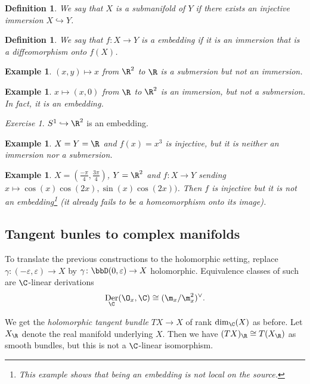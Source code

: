 \documentclass[A4paper, british]{amsart}
\theoremstyle{darkgreentheorem}
\theoremstyle{darkbluedefinition}
\newtheorem{defn}[thm]{Definition}
\theoremstyle{darkredexample}
\newtheorem{exa}[thm]{Example}
\theoremstyle{remark}
\newtheorem{exe}[thm]{Exercise}
\DeclareMathOperator{\Der}{Der}
\newcommand{\1}{\mathbbm{1}}
\newcommand{\dual}{^{\vee}}
\newcommand{\mono}{\hookrightarrow}
\begin{document}
\begin{defn}
    We say that $X$ is a \textit{submanifold} of $Y$ if there exists an injective immersion $X\mono Y$.
\end{defn}

\begin{defn}
    We say that $f\colon X\to Y$ is a \textit{embedding} if it is an immersion that is a diffeomorphism onto $f(X)$.
\end{defn}

\begin{exa}
    $(x,y)\mapsto x$ from $\R^{2}$ to $\R$ is a submersion but not an immersion.
\end{exa}

\begin{exa}
    $x\mapsto (x,0)$ from $\R$ to $\R^{2}$ is an immersion, but not a submersion.
    In fact, it is an embedding.
\end{exa}

\begin{exe}
    $S^{1}\mono \R^{2}$ is an embedding.
\end{exe}

\begin{exa}
    $X=Y=\R$ and $f(x)=x^{3}$ is injective, but it is neither an immersion nor a submersion.
\end{exa}

\begin{exa}
    $X=(\frac{-\pi}{4},\frac{3\pi}{4})$, $Y=\R^{2}$ and $f\colon X\to Y$ sending $x\mapsto \cos(x)\cos(2x),\sin(x)\cos(2x))$.
    Then $f$ is injective but it is not an embedding\footnote{This example shows that being an embedding is not local on the source.} (it already fails to be a homeomorphism onto its image).
\end{exa}

\subsection{Tangent bunles to complex manifolds}

To translate the previous constructions to the holomorphic setting, replace $\gamma\colon (-\varepsilon,\varepsilon)\to X$ by $\gamma\colon \bbD(0,\varepsilon)\to X$ holomorphic.
Equivalence classes of such are $\C$-linear derivations
\[ \Der_{\C}(\O_{x},\C)\cong (\m_{x}/\m_{x}^{2})\dual. \]

We get the \textit{holomorphic tangent bundle} $TX\to X$ of rank $\dim_{\C}(X)$ as before.
Let $X_{\R}$ denote the real manifold underlying $X$.
Then we have $(TX)_{\R}\cong T(X_{\R})$ as smooth bundles, but this is not a $\C$-linear isomorphism.
\end{document}
